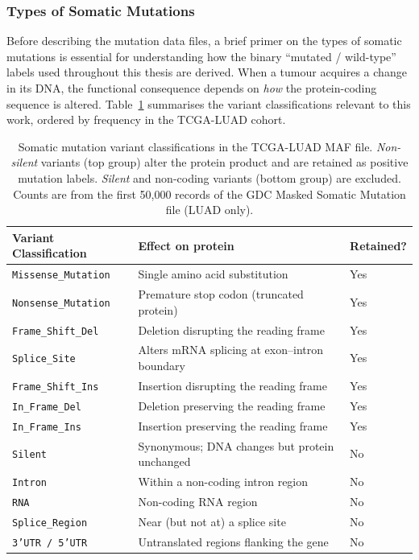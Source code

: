 \subsubsection{Types of Somatic Mutations}
\label{sec:uc:tcga:variant_types}

Before describing the mutation data files, a brief primer on the types
of somatic mutations is essential for understanding how the binary
``mutated / wild-type'' labels used throughout this thesis are derived.
When a tumour acquires a change in its DNA, the functional consequence
depends on \emph{how} the protein-coding sequence is altered.
Table~\ref{tab:variant_types} summarises the variant classifications
relevant to this work, ordered by frequency in the TCGA-LUAD cohort.

\begin{table}[ht!]
\centering
\small
\caption{Somatic mutation variant classifications in the TCGA-LUAD
MAF file.
\emph{Non-silent} variants (top group) alter the protein product and
are retained as positive mutation labels.
\emph{Silent} and non-coding variants (bottom group) are excluded.
Counts are from the first 50,000 records of the GDC Masked Somatic
Mutation file (LUAD only).}
\label{tab:variant_types}
\begin{tabular}{l l l}
\hline
\textbf{Variant Classification} & \textbf{Effect on protein} & \textbf{Retained?} \\
\hline
\texttt{Missense\_Mutation}  & Single amino acid substitution         & Yes \\
\texttt{Nonsense\_Mutation}  & Premature stop codon (truncated protein) & Yes \\
\texttt{Frame\_Shift\_Del}   & Deletion disrupting the reading frame   & Yes \\
\texttt{Splice\_Site}        & Alters mRNA splicing at exon--intron boundary & Yes \\
\texttt{Frame\_Shift\_Ins}   & Insertion disrupting the reading frame  & Yes \\
\texttt{In\_Frame\_Del}      & Deletion preserving the reading frame   & Yes \\
\texttt{In\_Frame\_Ins}      & Insertion preserving the reading frame  & Yes \\
\hline
\texttt{Silent}              & Synonymous; DNA changes but protein unchanged & No \\
\texttt{Intron}              & Within a non-coding intron region       & No \\
\texttt{RNA}                 & Non-coding RNA region                   & No \\
\texttt{Splice\_Region}      & Near (but not at) a splice site         & No \\
\texttt{3'UTR / 5'UTR}       & Untranslated regions flanking the gene  & No \\
\hline
\end{tabular}
\end{table}

